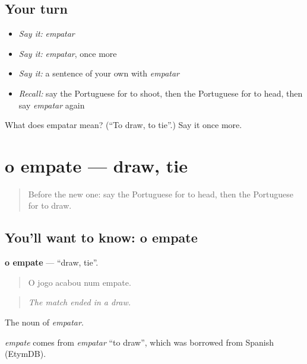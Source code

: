 \subsection*{Your turn}
\begin{itemize}
\raggedright
  \item \emph{Say it:} \emph{empatar}
  \item \emph{Say it:} \emph{empatar}, once more
  \item \emph{Say it:} a sentence of your own with \emph{empatar}
  \item \emph{Recall:} say the Portuguese for to shoot, then the Portuguese for to head, then say \emph{empatar} again
\end{itemize}

\begin{tcolorbox}[breakable,colback=teal!4,colframe=teal!35!black,title={Before you move on}]
What does empatar mean? (\textquotedblleft{}To draw, to tie\textquotedblright{}.) Say it once more.
\end{tcolorbox}
\section[o empate]{o empate — draw, tie}

\label{lesson:PT-C510-empate}



\begin{quote}
Before the new one: say the Portuguese for to head, then the Portuguese for to draw.
\end{quote}

\subsection*{You'll want to know: o empate}
\textbf{o empate} — \textquotedblleft{}draw, tie\textquotedblright{}.

\begin{quote}
O jogo acabou num empate.
\end{quote}

\begin{quote}
\emph{The match ended in a draw.}
\end{quote}

The noun of \emph{empatar}.

\begin{cousinweb}
\emph{empate} comes from \emph{empatar} \textquotedblleft{}to draw\textquotedblright{}, which was borrowed from Spanish (EtymDB).
\end{cousinweb}

